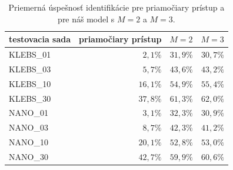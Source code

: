 \begin{table}[]
\centering
\caption{Priemerná úspešnosť identifikácie pre priamočiary prístup a pre náš model s $M=2$ a $M=3$.}
\label{tab:uspesnost_final}
\begin{tabular}{lrrr}
\hline
testovacia sada & priamočiary prístup & $M=2$     & $M=3$     \\ \hline
KLEBS\_01       & $2,1 \%$           & $31,9 \%$ & $30,7 \%$ \\
KLEBS\_03       & $5,7 \%$           & $43,6 \%$ & $43,2 \%$ \\
KLEBS\_10       & $16,1 \%$           & $54,9 \%$ & $55,4 \%$ \\
KLEBS\_30       & $37,8 \%$           & $61,3 \%$ & $62,0 \%$ \\
NANO\_01        & $3,1 \%$           & $32,3 \%$ & $30,9 \%$ \\
NANO\_03        & $8,7 \%$           & $42,3 \%$ & $41,2 \%$ \\
NANO\_10        & $20,1 \%$           & $52,8 \%$ & $53,0 \%$ \\
NANO\_30        & $42,7 \%$           & $59,9 \%$ & $60,6 \%$
\end{tabular}
\end{table}
